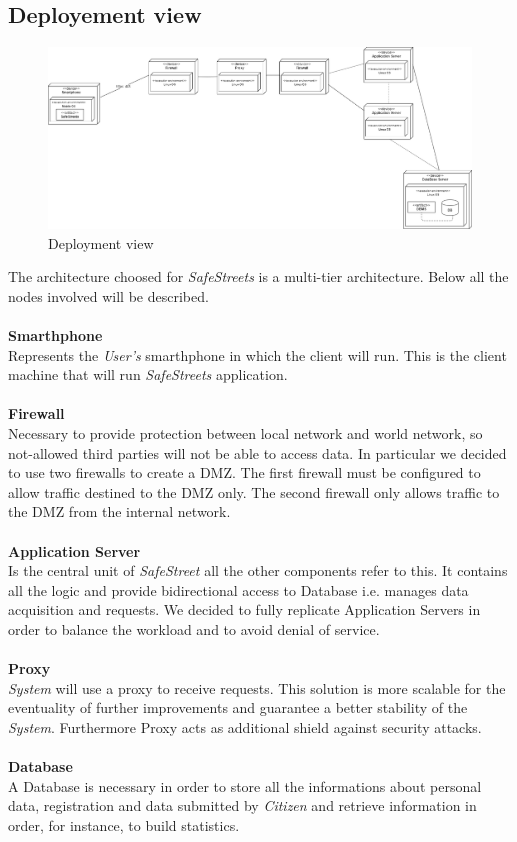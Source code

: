\documentclass{article}
\begin{document}
\clearpage

\subsection{Deployement view}
\begin{figure}[H]
    \centering
    \includegraphics[scale=0.3]{img/Deployment_component.png}
    \caption{Deployment view}
\end{figure}  
The architecture choosed for \textit{SafeStreets} is a multi-tier architecture. Below all the nodes 
involved will be described.
\\
\\
\textbf{Smarthphone}\\
Represents the \textit{User's} smarthphone in which the client will run. This is the client machine
that will run \textit{SafeStreets} application.
\\
\\
\textbf{Firewall}\\
Necessary to provide protection between local network and world network, so not-allowed third 
parties will not be able to access data. In particular we decided to use two firewalls to create a DMZ. 
The first firewall must be configured to allow traffic destined to the DMZ only. The second firewall 
only allows traffic to the DMZ from the internal network.
\\
\\
\textbf{Application Server}\\
Is the central unit of \textit{SafeStreet} all the other components refer to this. It 
contains all the logic and provide bidirectional access to Database i.e. manages data 
acquisition and requests. We decided to fully replicate Application Servers in order 
to balance the workload and to avoid denial of service.
\\
\\
\textbf{Proxy}\\
\textit{System} will use a proxy to receive requests. This solution is more scalable 
for the eventuality of further improvements and guarantee a better stability of 
the \textit{System}. Furthermore Proxy acts as additional shield against security attacks.  
\\
\\
\textbf{Database}\\
A Database is necessary in order to store all the informations about personal data, 
registration and data submitted by \textit{Citizen} and retrieve information in order, 
for instance, to build statistics.
\end{document}
